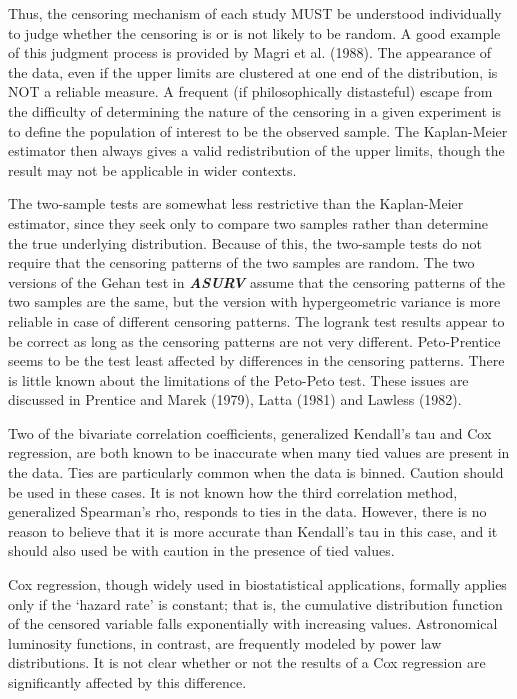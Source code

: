      Thus, the censoring mechanism of each study MUST be understood  
individually to judge whether the censoring is or is not likely to be  
random.  A good example of this judgment process is provided by 
Magri et al. (1988).  The appearance of the data, even if the upper limits 
are clustered at one end of the distribution, is NOT a reliable measure. A 
frequent (if philosophically distasteful) escape from the difficulty of
determining the nature of the censoring in a given experiment is to define
the population of interest to be the observed sample. The Kaplan-Meier
estimator then always gives a valid redistribution of the upper limits,
though the result may not be applicable in wider contexts. 

     The two-sample tests are somewhat less restrictive than the
Kaplan-Meier estimator, since they seek only to compare two samples rather
than  determine the true underlying distribution.  Because of this, the
two-sample tests do not require that the censoring patterns of the two samples 
are random.  The two versions of the Gehan test in {\sl\bf ASURV} assume 
that the censoring patterns of the two samples are the same, but 
the version with hypergeometric variance is more reliable in case of 
different censoring patterns.  The logrank test results appear to be 
correct as long as the censoring patterns are not very different.  
Peto-Prentice seems to be the test least affected by differences in 
the censoring patterns.  There is little known about the limitations of 
the Peto-Peto test. These issues are discussed in Prentice and Marek (1979), 
Latta (1981) and Lawless (1982). 

     Two of the bivariate correlation coefficients, generalized Kendall's tau 
and Cox regression, are both known to be inaccurate when many tied values
are present in the data.  Ties are particularly common when the data is
binned.  Caution should be used in these cases.  It is not known how the
third correlation method, generalized Spearman's rho,  responds to ties in the
data.  However, there is no reason to believe that it is more accurate than
Kendall's tau in this case, and it should also used be with caution in the 
presence of tied values.

     Cox regression, though widely used in biostatistical  applications,
formally applies only if the `hazard rate' is constant; that is,  the 
cumulative distribution function of the censored variable falls 
exponentially with increasing values.  Astronomical luminosity functions,
in contrast, are frequently modeled by power law distributions.  It is not 
clear whether or not the results of a Cox regression are significantly
affected by this difference.

